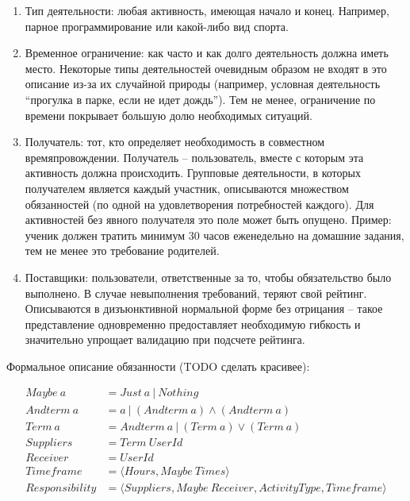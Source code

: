 \documentclass[specification,annotation]{itmo-student-thesis}
\begin{document}
\begin{enumerate}
\item Тип деятельности: любая активность, имеющая начало и
  конец. Например, парное программирование или какой-либо вид спорта.
\item Временное ограничение: как часто и как долго деятельность должна
  иметь место. Некоторые типы деятельностей очевидным образом не
  входят в это описание из-за их случайной природы (например, условная
  деятельность ``прогулка в парке, если не идет дождь''). Тем не
  менее, ограничение по времени покрывает большую долю необходимых
  ситуаций.
\item Получатель: тот, кто определяет необходимость в совместном
  времяпровождении. Получатель -- пользователь, вместе с которым эта
  активность должна происходить. Групповые деятельности, в которых
  получателем является каждый участник, описываются множеством
  обязанностей (по одной на удовлетворения потребностей каждого). Для
  активностей без явного получателя это поле может быть
  опущено. Пример: ученик должен тратить минимум 30 часов еженедельно
  на домашние задания, тем не менее это требование родителей.
\item Поставщики: пользователи, ответственные за то, чтобы
  обязательство было выполнено. В случае невыполнения требований,
  теряют свой рейтинг. Описываются в дизъюнктивной нормальной форме
  без отрицания -- такое представление одновременно предоставляет
  необходимую гибкость и значительно упрощает валидацию при подсчете
  рейтинга.
\end{enumerate}

Формальное описание обязанности (TODO сделать красивее):

\begin{align*}
Maybe \ a &= Just \ a \ | \ Nothing \\
Andterm \ a &= a \ | \ (Andterm \ a) \wedge (Andterm \ a) \\
Term \ a &= Andterm \ a \ | \ (Term \ a) \vee (Term \ a) \\
Suppliers &= Term \ UserId\\
Receiver &= UserId\\
Timeframe &= \langle Hours, Maybe \ Times \rangle\\
Responsibility &= \langle Suppliers, Maybe \ Receiver, ActivityType, Timeframe \rangle
\end{align*}
\end{document}
